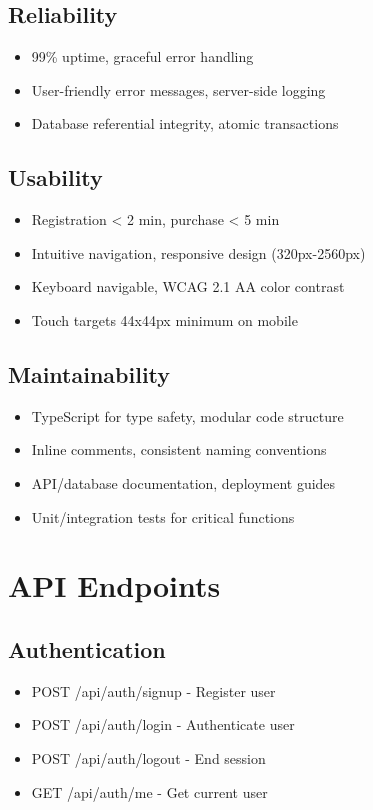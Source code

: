 \documentclass[11pt]{scrreprt}
\begin{document}
\section{Reliability}
\begin{itemize}
\item 99\% uptime, graceful error handling
\item User-friendly error messages, server-side logging
\item Database referential integrity, atomic transactions
\end{itemize}

\section{Usability}
\begin{itemize}
\item Registration < 2 min, purchase < 5 min
\item Intuitive navigation, responsive design (320px-2560px)
\item Keyboard navigable, WCAG 2.1 AA color contrast
\item Touch targets 44x44px minimum on mobile
\end{itemize}

\section{Maintainability}
\begin{itemize}
\item TypeScript for type safety, modular code structure
\item Inline comments, consistent naming conventions
\item API/database documentation, deployment guides
\item Unit/integration tests for critical functions
\end{itemize}

\chapter{API Endpoints}

\section{Authentication}
\begin{itemize}
\item POST /api/auth/signup - Register user
\item POST /api/auth/login - Authenticate user
\item POST /api/auth/logout - End session
\item GET /api/auth/me - Get current user
\end{itemize}
\end{document}
